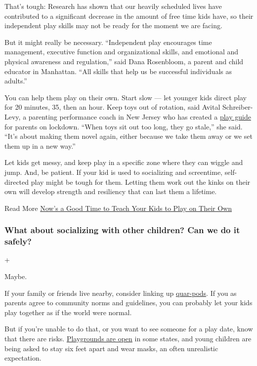 That's tough: Research has shown that our heavily scheduled lives have
contributed to a significant decrease in the amount of free time kids
have, so their independent play skills may not be ready for the moment
we are facing.

But it might really be necessary. ``Independent play encourages time
management, executive function and organizational skills, and emotional
and physical awareness and regulation,'' said Dana Rosenbloom, a parent
and child educator in Manhattan. ``All skills that help us be successful
individuals as adults.''

You can help them play on their own. Start slow --- let younger kids
direct play for 20 minutes, 35, then an hour. Keep toys out of rotation,
said Avital Schreiber-Levy, a parenting performance coach in New Jersey
who has created a
\href{https://www.theparentingjunkie.com/wp-content/uploads/2020/03/PlayPandemic-Newer.pdf}{play
guide} for parents on lockdown. ``When toys sit out too long, they go
stale,'' she said. ``It's about making them novel again, either because
we take them away or we set them up in a new way.''

Let kids get messy, and keep play in a specific zone where they can
wiggle and jump. And, be patient. If your kid is used to socializing and
screentime, self-directed play might be tough for them. Letting them
work out the kinks on their own will develop strength and resiliency
that can last them a lifetime.

 Read More
\href{https://www.nytimes.com/2020/04/03/parenting/kids-independent-play-coronavirus-quarantine.html}{Now's
a Good Time to Teach Your Kids to Play on Their Own}

\hypertarget{what-about-socializing-with-other-children-can-we-do-it-safely}{%
\subsubsection{What about socializing with other children? Can we do it
safely?}\label{what-about-socializing-with-other-children-can-we-do-it-safely}}

+

Maybe.

If your family or friends live nearby, consider linking up
\href{https://www.nytimes.com/2020/06/09/parenting/coronavirus-pod-family.html}{quar-pods}.
If you as parents agree to community norms and guidelines, you can
probably let your kids play together as if the world were normal.

But if you're unable to do that, or you want to see someone for a play
date, know that there are risks.
\href{https://www.nytimes.com/2020/06/11/parenting/playgrounds-reopen-safety-coronavirus.html}{Playgrounds
are open} in some states, and young children are being asked to stay six
feet apart and wear masks, an often unrealistic expectation.

